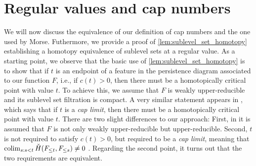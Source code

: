 
\section{Regular values and cap numbers} \label{s:caps}
We will now discuss the equivalence of our definition of cap numbers and the one used by Morse.
Futhermore, we provide a proof of \cref{lem:sublevel_set_homotopy} establishing a homotopy equivalence of sublevel sets at a regular value.
As a starting point, we observe that the basic use of \cref{lem:sublevel_set_homotopy} is to show that if $t$ is an endpoint of a feature in the persistence diagram associated to our function $F$, i.e., if $c(t) > 0$, then there must be a homotopically critical point with value $t$.
To achieve this, we assume that $F$ is weakly upper-reducible and its sublevel set filtration is compact.
A very similar statement appears in \cite[Theorem 8.1]{Morse.1938}, which says that if $t$ is a \emph{cap limit}, then there must be a homotopically critical point with value $t$.
There are two slight differences to our approach:
First, in \cite[Theorem 8.1]{Morse.1938} it is assumed that $F$ is not only weakly upper-reducible but upper-reducible.
Second, $t$ is not required to satisfy $c(t) > 0$, but required to be a \emph{cap limit}, meaning that $\operatorname*{colim}_{s: s < t} \check{H}(F_{\leq t}, F_{\leq s}) \neq 0$ \cite[p.~12]{Morse.1938}.
Regarding the second point, it turns out that the two requirements are equivalent.

